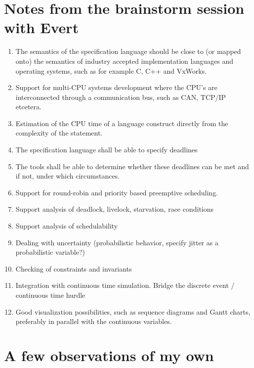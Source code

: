 \documentclass{llncs}
\begin{document}
\section{Notes from the brainstorm session with Evert}


\begin{enumerate}
\item The semantics of the specification language should be close to
(or mapped onto) the semantics of industry accepted implementation 
languages and operating systems, such as for example C, C++ and VxWorks.
\item Support for multi-CPU systems development where the CPU's are
interconnected through a communication bus, such as CAN, TCP/IP etcetera.
\item Estimation of the CPU time of a language construct directly from
the complexity of the statement.
\item The specification language shall be able to specify deadlines
\item The tools shall be able to determine whether these deadlines can
be met and if not, under which circumstances.
\item Support for round-robin and priority based preemptive scheduling.
\item Support analysis of deadlock, livelock, starvation, race conditions
\item Support analysis of schedulability
\item Dealing with uncertainty (probabilistic behavior, specify jitter
as a probabilistic variable?)
\item Checking of constraints and invariants
\item Integration with continuous time simulation. Bridge the discrete
event / continuous time hurdle
\item Good visualization possibilities, such as sequence diagrams
and Gantt charts, preferably in parallel with the continuous variables.
\end{enumerate}

\section{A few observations of my own}
\end{document}
